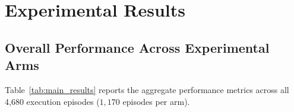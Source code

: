 \section{Experimental Results}
\label{sec:results}

\subsection{Overall Performance Across Experimental Arms}
Table~\ref{tab:main_results} reports the aggregate performance metrics across all 4,680 execution episodes ($1,170$ episodes per arm).


